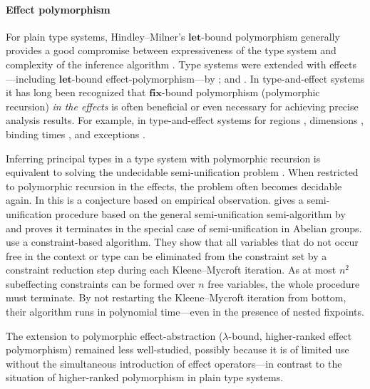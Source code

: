 \documentclass{llncs}
\begin{document}
\paragraph{Effect polymorphism} For plain type systems, Hindley--Milner's \ensuremath{\mathbf{let}}-bound polymorphism generally provides a good compromise between expressiveness of the type system and complexity of the inference algorithm \cite{Hindley1969,Milner78atheory,Damas:1982:PTF:582153.582176}.
Type systems were extended with effects---including \ensuremath{\mathbf{let}}-bound effect-polymorphism---by \cite{Lucassen:1988:PES:73560.73564,Jouvelot:1991:ART:99583.99623}; and \cite{JFP:1457464,Talpin:1994:TED:191349.184660}.
In type-and-effect systems it has long been recognized that $\mathbf{fix}$-bound polymorphism (polymorphic recursion) \emph{in the effects} is often beneficial or even necessary for achieving precise analysis results. For example, in type-and-effect systems for regions \cite{Tofte:1994:ITC:174675.177855}, dimensions \cite{Kennedy:1994:DT:645390.651419,Rittri:1994:STT:194679.194683,Rittri:1995:DIU:224164.224197}, binding times \cite{Dussart:1995:PRS:647163.717680}, and exceptions \cite{Glynn:2002:EAN:581478.581488,Koot:2015:TEA:2678015.2682542}.

Inferring principal types in a type system with polymorphic recursion is equivalent to solving the undecidable semi-unification problem \cite{Mycroft1984,Kfoury:1990:USP:100216.100279,Kfoury:1993:TRP:169701.169687,Henglein:1993:TIP:169701.169692}.
When restricted to polymorphic recursion in the effects, the problem often becomes decidable again. In \cite{Tofte:1994:ITC:174675.177855} this is a conjecture based on empirical observation. \cite{Rittri:1995:DIU:224164.224197} gives a semi-unification procedure based on the general semi-unification semi-algorithm by \cite{Baaz93APTCC} and proves it terminates in the special case of semi-unification in Abelian groups. \cite{Dussart:1995:PRS:647163.717680} use a constraint-based algorithm. They show that all variables that do not occur free in the context or type can be eliminated from the constraint set by a constraint reduction step during each Kleene--Mycroft iteration. As at most $n^2$ subeffecting constraints can be formed over $n$ free variables, the whole procedure must terminate. By not restarting the Kleene--Mycroft iteration from bottom, their algorithm runs in polynomial time---even in the presence of nested fixpoints.

The extension to polymorphic effect-abstraction ($\lambda$-bound, higher-ranked effect polymorphism) remained less well-studied, possibly because it is of limited use without the simultaneous introduction of effect operators---in contrast to the situation of higher-ranked polymorphism in plain type systems.
\end{document}
